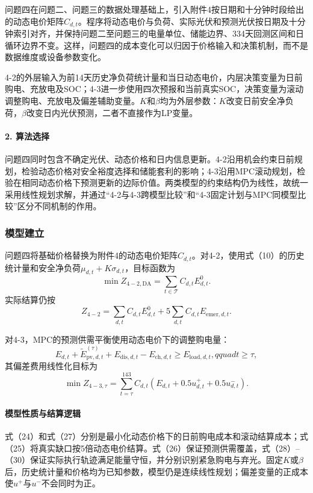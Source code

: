 \documentclass{cumcmthesis}
\newcommand{\Tset}{\mathcal{T}}
\begin{document}
问题四在问题二、问题三的数据处理基础上，引入附件4按日期和十分钟时段给出的动态电价矩阵$C_{d,t}$。程序将动态电价与负荷、实际光伏和预测光伏按日期及十分钟索引对齐，并保持问题二至问题三的电量单位、储能边界、334天回测区间和日循环边界不变。这样，问题四的成本变化可以归因于价格输入和决策机制，而不是数据维度或设备参数变化。

4-2的外层输入为前14天历史净负荷统计量和当日动态电价，内层决策变量为日前购电、充放电及SOC；4-3进一步使用四次预报和当前真实SOC，决策变量为滚动调整购电、充放电及偏差辅助变量。$K$和$\beta$均为外层参数：$K$改变日前安全净负荷，$\beta$改变日内光伏预测，二者不直接作为LP变量。

\paragraph{2. 算法选择}

问题四同时包含不确定光伏、动态价格和日内信息更新。4-2沿用机会约束日前规划，检验动态价格对安全裕度选择和储能套利的影响；4-3沿用MPC滚动规划，检验在相同动态价格下预测更新的边际价值。两类模型的约束结构仍为线性，故统一采用线性规划求解，并通过“4-2与4-3跨模型比较”和“4-3固定计划与MPC同模型比较”区分不同机制的作用。

\subsubsection{模型建立}

问题四将基础价格替换为附件4的动态电价矩阵$C_{d,t}$。对4-2，使用式（10）的历史统计量和安全净负荷$\mu_{d,t}+K\sigma_{d,t}$，目标函数为
\begin{equation}
\min Z_{4-2,\mathrm{DA}}=\sum_{t\in\Tset}C_{d,t}E^0_{d,t}.
\tag{24}
\end{equation}
实际结算仍按
\begin{equation}
Z_{4-2}=\sum_{d,t}C_{d,t}E^0_{d,t}+5\sum_{d,t}C_{d,t}E_{\mathrm{emer},d,t}.
\tag{25}
\end{equation}

对4-3，MPC的预测供需平衡使用动态电价下的调整购电量：
\begin{equation}
E_{d,t}+\widetilde E_{\mathrm{pv},d,t}^{(\tau)}+E_{\mathrm{dis},d,t}-E_{\mathrm{ch},d,t}
\geq E_{\mathrm{load},d,t},qquad t\geq\tau,
\tag{26}
\end{equation}
其偏差费用线性化目标为
\begin{equation}
\min Z_{4-3,\tau}=\sum_{t=\tau}^{143}C_{d,t}
\left(E_{d,t}+0.5u^+_{d,t}+0.5u^-_{d,t}\right).
\tag{27}
\end{equation}
\paragraph{模型性质与结算逻辑}
式（24）和式（27）分别是最小化动态价格下的日前购电成本和滚动结算成本；式（25）将真实缺口按5倍动态电价结算。式（26）保证预测供需覆盖，式（28）--（30）保证实际执行轨迹满足能量守恒，并分别识别紧急购电与弃光。固定$K$或$\beta$后，历史统计量和价格均为已知参数，模型仍是连续线性规划；偏差变量的正成本使$u^+$与$u^-$不会同时为正。
\end{document}
